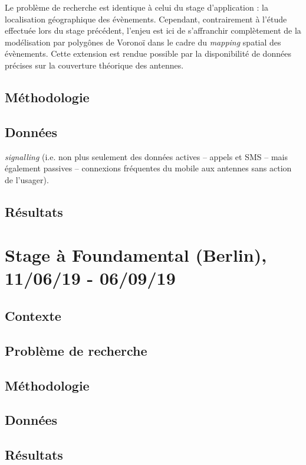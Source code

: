 \documentclass[12pt]{article}
\begin{document}
Le problème de recherche est identique à celui du stage d'application : la localisation géographique des évènements. Cependant, contrairement à l'étude effectuée lors du stage précédent, l'enjeu est ici de s'affranchir complètement de la modélisation par polygônes de Voronoï dans le cadre du \textit{mapping} spatial des évènements. Cette extension est rendue possible par la disponibilité de données précises sur la couverture théorique des antennes.

\subsection{Méthodologie}



\subsection{Données}

\textit{signalling} (i.e. non plus seulement des données actives -- appels et SMS -- mais également passives -- connexions fréquentes du mobile aux antennes sans action de l'usager).

\subsection{Résultats}

\section{Stage à Foundamental (Berlin), 11/06/19 - 06/09/19}

\subsection{Contexte}

\subsection{Problème de recherche}

\subsection{Méthodologie}

\subsection{Données}

\subsection{Résultats}
\end{document}
